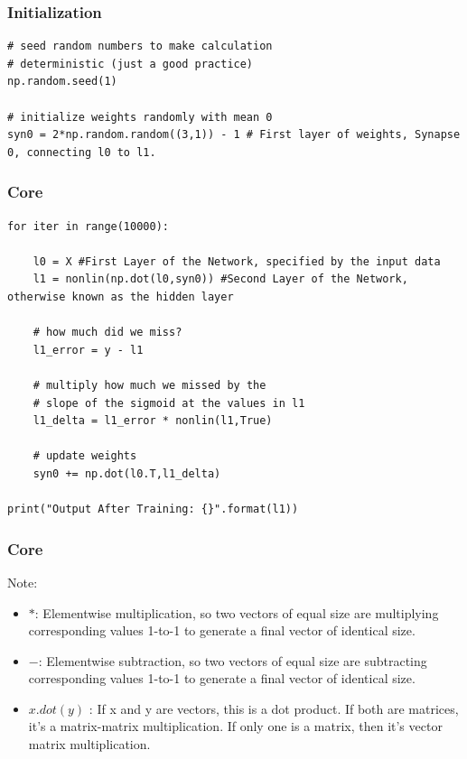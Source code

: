 \begin{frame}[fragile] \frametitle{Initialization}

\begin{lstlisting}
# seed random numbers to make calculation
# deterministic (just a good practice)
np.random.seed(1)

# initialize weights randomly with mean 0
syn0 = 2*np.random.random((3,1)) - 1 # First layer of weights, Synapse 0, connecting l0 to l1.
\end{lstlisting}
\end{frame}


\begin{frame}[fragile] \frametitle{Core}

\begin{lstlisting}
for iter in range(10000):

    l0 = X #First Layer of the Network, specified by the input data
    l1 = nonlin(np.dot(l0,syn0)) #Second Layer of the Network, otherwise known as the hidden layer

    # how much did we miss?
    l1_error = y - l1

    # multiply how much we missed by the 
    # slope of the sigmoid at the values in l1
    l1_delta = l1_error * nonlin(l1,True) 

    # update weights
    syn0 += np.dot(l0.T,l1_delta)

print("Output After Training: {}".format(l1))
\end{lstlisting}
\end{frame}

\begin{frame}[fragile] \frametitle{Core}
Note:
\begin{itemize}
\item $*$: Elementwise multiplication, so two vectors of equal size are multiplying corresponding values 1-to-1 to generate a final vector of identical size.
\item $-$:  Elementwise subtraction, so two vectors of equal size are subtracting corresponding values 1-to-1 to generate a final vector of identical size.
\item $x.dot(y)$ : If x and y are vectors, this is a dot product. If both are matrices, it's a matrix-matrix multiplication. If only one is a matrix, then it's vector matrix multiplication.
\end{itemize}
\end{frame}


